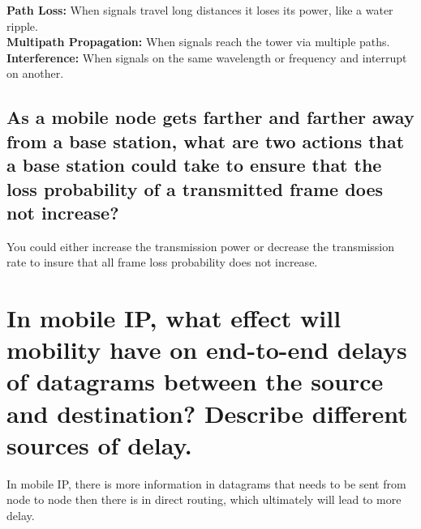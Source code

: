 \documentclass[10pt,a4paper]{article}
\begin{document}
\textbf{Path Loss:} When signals travel long distances it loses its power, like a water ripple. \\
\textbf{Multipath Propagation:} When signals reach the tower via multiple paths.\\
\textbf{Interference:} When signals on the same wavelength or frequency and interrupt on another.\\

\subsection{As a mobile node gets farther and farther away from a base station, what are two actions that a base station could take to ensure that the loss probability of a transmitted frame does not increase?}

You could either increase the transmission power or decrease the transmission rate to insure that all frame loss probability does not increase.

\section{In mobile IP, what effect will mobility have on end-to-end delays of datagrams between the source and destination? Describe different sources of delay.}

In mobile IP, there is more information in datagrams that needs to be sent from node to node then there is in direct routing, which ultimately will lead to more delay.
\end{document}
